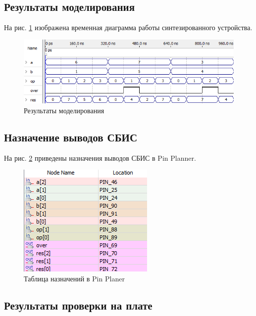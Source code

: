 \subsection{Результаты моделирования}
\label{sec:elab5_1_modeling}

На рис. \ref{fig:elab5_1_modeling} изображена временная диаграмма работы синтезированного устройства. 

\begin{figure}[H]
\begin{center}
	\includegraphics[width=\textwidth]{elab5_1_modeling}
	\caption{Результаты моделирования}
	\label{fig:elab5_1_modeling}
\end{center}
\end{figure}

\subsection{Назначение выводов СБИС}

На рис. \ref{fig:elab5_1_pins} приведены назначения выводов СБИС в Pin Planner.

\begin{figure}[H]
\begin{center}
	\includegraphics{elab5_1_pins}
	\caption{Таблица назначений в Pin Planer}
	\label{fig:elab5_1_pins}
\end{center}
\end{figure}

\subsection{Результаты проверки на плате}

